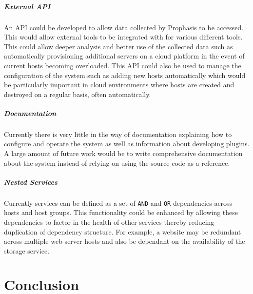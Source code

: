 \documentclass[bsc,logo,twoside,singlespacing,notimes]{infthesis}
\begin{document}
\paragraph*{External API}
	An API could be developed to allow data collected by Prophasis to be accessed.
	This would allow external tools to be integrated with for various different
	tools.  This could allow deeper analysis and better use of the collected data
	such as automatically provisioning additional servers on a cloud platform in
	the event of current hosts becoming overloaded.  This API could also be used
	to manage the configuration of the system such as adding new hosts
	automatically which would be particularly important in cloud environments where
	hosts are created and destroyed on a regular basis, often automatically.
	
\paragraph*{Documentation}
	Currently there is very little in the way of documentation explaining how to
	configure and operate the system as well as information about developing
	plugins.  A large amount of future work would be to write comprehensive
	documentation about the system instead of relying on using the source code as a
	reference.
	
\paragraph*{Nested Services}
	Currently services can be defined as a set of \texttt{AND} and \texttt{OR}
	dependencies across hosts and host groups.  This functionality could be
 	enhanced by allowing these dependencies to factor in the health of other
 	services thereby reducing duplication of dependency structure.  For example,
 	a website may be redundant across multiple web server hosts and also be
 	dependant on the availability of the storage service.


\chapter{Conclusion}
\end{document}
